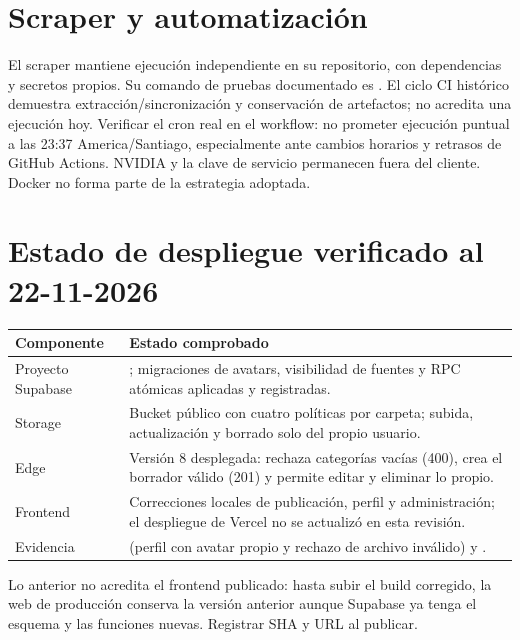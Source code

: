 \documentclass[11pt,a4paper]{article}
\begin{document}
\section{Scraper y automatización}
El scraper mantiene ejecución independiente en su repositorio, con dependencias y
secretos propios. Su comando de pruebas documentado es
. El ciclo CI histórico demuestra
extracción/sincronización y conservación de artefactos; no acredita una ejecución hoy.
Verificar el cron real en el workflow: no prometer ejecución puntual a las 23:37
America/Santiago, especialmente ante cambios horarios y retrasos de GitHub Actions.
NVIDIA y la clave de servicio permanecen fuera del cliente.
Docker no forma parte de la estrategia adoptada.

\section{Estado de despliegue verificado al 22-11-2026}

\begin{longtable}{@{}L{5.2cm}L{9.6cm}@{}}
\toprule
\textbf{Componente} & \textbf{Estado comprobado} \\
\midrule
\endhead
Proyecto Supabase & ; migraciones de avatars, visibilidad de fuentes y RPC atómicas aplicadas y registradas. \\
Storage  & Bucket público con cuatro políticas por carpeta; subida, actualización y borrado solo del propio usuario. \\
Edge  & Versión 8 desplegada: rechaza categorías vacías (400), crea el borrador válido (201) y permite editar y eliminar lo propio. \\
Frontend & Correcciones locales de publicación, perfil y administración; el despliegue de Vercel no se actualizó en esta revisión. \\
Evidencia &  (perfil con avatar propio y rechazo de archivo inválido) y . \\
\bottomrule
\end{longtable}

Lo anterior no acredita el frontend publicado: hasta subir el build corregido, la web de
producción conserva la versión anterior aunque Supabase ya tenga el esquema y las
funciones nuevas. Registrar SHA y URL al publicar.
\end{document}
